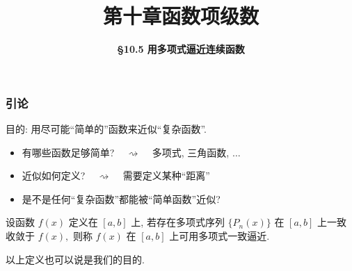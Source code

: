 \everymath{\displaystyle}



\title[第十章\\
函数项级数]{\texorpdfstring{\LARGE \bfseries 第十章\quad 函数项级数}{第十章 函数项级数}} %
\author[\smaller \S 10.5\\
多项式逼近] %
{\Large \bfseries \S 10.5 用多项式逼近连续函数}
\date{}





\begin{frame}

\titlepage %

\end{frame}



\begin{frame}
\frametitle{引论}

目的: 用尽可能``简单的''函数来\alert{近似}``复杂函数''.

\pause
\vspace{1em}

\begin{question}
\pause
\begin{itemize}
\item 有哪些函数足够简单? \pause ~ $\rightsquigarrow$ ~ 多项式, 三角函数, $\dots$
\pause
\item \alert{近似}如何定义? \pause ~ $\rightsquigarrow$ ~ 需要定义某种``距离''
\item 是不是任何``复杂函数''都能被``简单函数''近似?
\end{itemize}
\end{question}

\pause
\vspace{1em}

\begin{Def}[多项式一致逼近]
设函数 $f(x)$ 定义在 $[a, b]$ 上, 若存在多项式序列 $\{ P_n(x) \}$ 在 $[a, b]$ 上一致收敛于 $f(x),$ 则称 $f(x)$ 在 $[a, b]$ 上可用多项式一致逼近.
\end{Def}

以上定义也可以说是我们的目的.

\end{frame}

